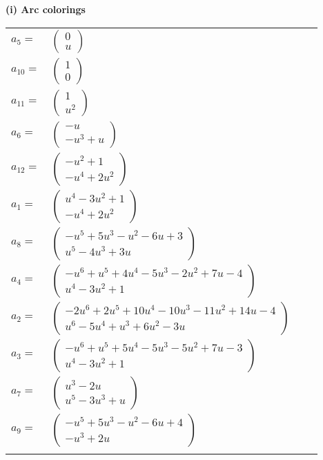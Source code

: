 \documentclass[1p]{elsarticle_modified}
\theoremstyle{definition}
\begin{document}
\flushleft \textbf{(i) Arc colorings}\\
\begin{tabular}{m{7pt} m{180pt} m{7pt} m{180pt} }
\flushright $a_{5}=$&$\begin{pmatrix}0\\u\end{pmatrix}$ \\
\flushright $a_{10}=$&$\begin{pmatrix}1\\0\end{pmatrix}$ \\
\flushright $a_{11}=$&$\begin{pmatrix}1\\u^2\end{pmatrix}$ \\
\flushright $a_{6}=$&$\begin{pmatrix}- u\\- u^3+u\end{pmatrix}$ \\
\flushright $a_{12}=$&$\begin{pmatrix}- u^2+1\\- u^4+2 u^2\end{pmatrix}$ \\
\flushright $a_{1}=$&$\begin{pmatrix}u^4-3 u^2+1\\- u^4+2 u^2\end{pmatrix}$ \\
\flushright $a_{8}=$&$\begin{pmatrix}- u^5+5 u^3- u^2-6 u+3\\u^5-4 u^3+3 u\end{pmatrix}$ \\
\flushright $a_{4}=$&$\begin{pmatrix}- u^6+u^5+4 u^4-5 u^3-2 u^2+7 u-4\\u^4-3 u^2+1\end{pmatrix}$ \\
\flushright $a_{2}=$&$\begin{pmatrix}-2 u^6+2 u^5+10 u^4-10 u^3-11 u^2+14 u-4\\u^6-5 u^4+u^3+6 u^2-3 u\end{pmatrix}$ \\
\flushright $a_{3}=$&$\begin{pmatrix}- u^6+u^5+5 u^4-5 u^3-5 u^2+7 u-3\\u^4-3 u^2+1\end{pmatrix}$ \\
\flushright $a_{7}=$&$\begin{pmatrix}u^3-2 u\\u^5-3 u^3+u\end{pmatrix}$ \\
\flushright $a_{9}=$&$\begin{pmatrix}- u^5+5 u^3- u^2-6 u+4\\- u^3+2 u\end{pmatrix}$\\&\end{tabular}
\end{document}
